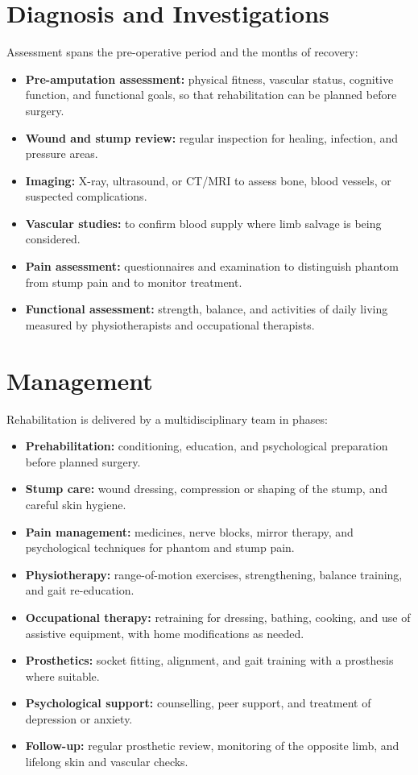\section*{Diagnosis and Investigations}
Assessment spans the pre-operative period and the months of recovery:

\begin{itemize}
    \item \textbf{Pre-amputation assessment:} physical fitness, vascular status, cognitive function, and functional goals, so that rehabilitation can be planned before surgery.
    \item \textbf{Wound and stump review:} regular inspection for healing, infection, and pressure areas.
    \item \textbf{Imaging:} X-ray, ultrasound, or CT/MRI to assess bone, blood vessels, or suspected complications.
    \item \textbf{Vascular studies:} to confirm blood supply where limb salvage is being considered.
    \item \textbf{Pain assessment:} questionnaires and examination to distinguish phantom from stump pain and to monitor treatment.
    \item \textbf{Functional assessment:} strength, balance, and activities of daily living measured by physiotherapists and occupational therapists.
\end{itemize}

\section*{Management}
Rehabilitation is delivered by a multidisciplinary team in phases:

\begin{itemize}
    \item \textbf{Prehabilitation:} conditioning, education, and psychological preparation before planned surgery.
    \item \textbf{Stump care:} wound dressing, compression or shaping of the stump, and careful skin hygiene.
    \item \textbf{Pain management:} medicines, nerve blocks, mirror therapy, and psychological techniques for phantom and stump pain.
    \item \textbf{Physiotherapy:} range-of-motion exercises, strengthening, balance training, and gait re-education.
    \item \textbf{Occupational therapy:} retraining for dressing, bathing, cooking, and use of assistive equipment, with home modifications as needed.
    \item \textbf{Prosthetics:} socket fitting, alignment, and gait training with a prosthesis where suitable.
    \item \textbf{Psychological support:} counselling, peer support, and treatment of depression or anxiety.
    \item \textbf{Follow-up:} regular prosthetic review, monitoring of the opposite limb, and lifelong skin and vascular checks.
\end{itemize}

